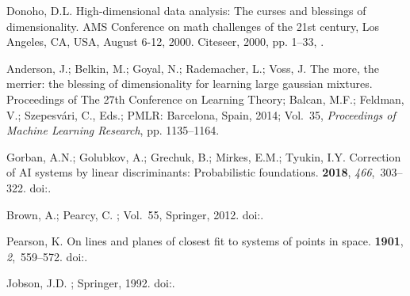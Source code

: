 \documentclass[entropy,article,submit,moreauthors,pdftex]{Definitions/mdpi}
\begin{document}
\begin{thebibliography}{-------}
Donoho, D.L.
\newblock High-dimensional data analysis: The curses and blessings of
  dimensionality.
\newblock  AMS Conference on math challenges of the 21st century, Los Angeles,
  CA, USA, August 6-12, 2000. Citeseer,  2000, pp. 1--33,
  \href{http://citeseerx.ist.psu.edu/viewdoc/summary?doi=10.1.1.329.3392}{{\normalfont
  [http://citeseerx.ist.psu.edu/viewdoc/summary?doi=10.1.1.329.3392]}}.

Anderson, J.; Belkin, M.; Goyal, N.; Rademacher, L.; Voss, J.
\newblock The more, the merrier: the blessing of dimensionality for learning
  large gaussian mixtures.
\newblock  Proceedings of The 27th Conference on Learning Theory; Balcan, M.F.;
  Feldman, V.; Szepesv\'{a}ri, C., Eds.; PMLR: Barcelona, Spain,  2014;
  Vol.~35, {\em Proceedings of Machine Learning Research}, pp. 1135--1164.

Gorban, A.N.; Golubkov, A.; Grechuk, B.; Mirkes, E.M.; Tyukin, I.Y.
\newblock Correction of {AI} systems by linear discriminants: Probabilistic
  foundations.
 {\bf 2018}, {\em 466},~303--322.
\newblock
  doi:{\href{https://doi.org/10.1016/j.ins.2018.07.040}{}}.

Brown, A.; Pearcy, C.
; Vol.~55, Springer,  2012.
\newblock
  doi:{\href{https://doi.org/10.1007/978-1-4612-9926-4}{}}.

Pearson, K.
 On lines and planes of closest fit to systems of points in
  space.
 {\bf 1901}, {\em
  2},~559--572.
\newblock
  doi:{\href{https://doi.org/10.1080/14786440109462720}{}}.

Jobson, J.D.
; Springer,  1992.
\newblock
  doi:{\href{https://doi.org/10.1007/978-1-4612-0921-8}{}}.


\end{thebibliography}
\end{document}

